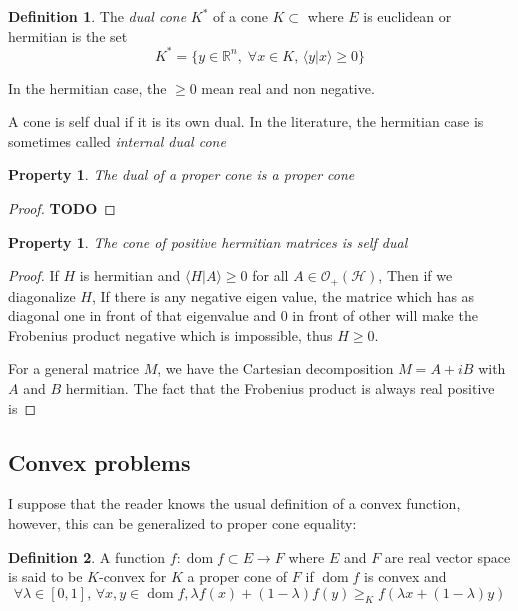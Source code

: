 \documentclass[10pt]{report}
\theoremstyle{plain}
\newtheorem{prop}[thm]{Property}
\theoremstyle{definition}
\newtheorem{defn}{Definition}[chapter]
\theoremstyle{remark}
\newcommand{\R}{\ensuremath{\mathbb{R}}}
\newcommand{\TODO}{\textbf{TODO}}
\newcommand{\braket}[2]{\langle#1|#2\rangle}
\renewcommand{\geq}{\geqslant}
\DeclareMathOperator{\dom}{dom}
\begin{document}
\begin{defn}
  The \emph{dual cone} $K^*$ of a cone $K \subset$ where $E$ is euclidean or hermitian is the set
  \[ K^* = \{y \in \R^n,\; \forall x \in K,\, \braket y x \geq 0\}\]

  In the hermitian case, the $\geq 0$ mean real and non negative.
\end{defn}

A cone is self dual if it is its own dual. In the literature, the hermitian case
is sometimes called \emph{internal dual cone}

\begin{prop}
  The dual of a proper cone is a proper cone
\end{prop}

\begin{proof}
  \TODO{}
\end{proof}

\begin{prop}
  The cone of positive hermitian matrices is self dual
\end{prop}

\begin{proof}
  If $H$ is hermitian and $\langle H | A \rangle \geq 0$ for all $A \in
  \mathcal{O}_+(\mathcal{H})$, Then if we diagonalize $H$, If there is any
  negative eigen value, the matrice which has as diagonal one in front of that
  eigenvalue and 0 in front of other will make the Frobenius product negative
  which is impossible, thus $H \geq 0$.

  For a general matrice $M$, we have the Cartesian decomposition $M = A + iB$
  with $A$ and $B$ hermitian. The fact that the Frobenius product is always real positive is

\end{proof}


\subsection{Convex problems}

I suppose that the reader knows the usual definition of a convex function,
however, this can be generalized to proper cone equality:

\begin{defn}
  A function $f : \dom f \subset E \to F$ where $E$ and $F$ are real vector
  space is said to be $K$-convex for $K$ a proper cone of $F$ if $\dom f$ is
  convex and
  \[\forall \lambda \in [0,1],\, \forall x,y \in \dom f, \lambda f(x) + (1 -
    \lambda)f(y) \geq_K f(\lambda x + (1-\lambda)y)\]
\end{defn}
\end{document}
